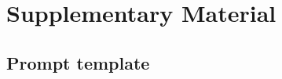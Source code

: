 \documentclass{article}
\begin{document}
	
	

        \printbibliography
	
	\appendix
	
	\section*{Supplementary Material}
	
	\subsection*{Prompt template}
	
	
\end{document}
